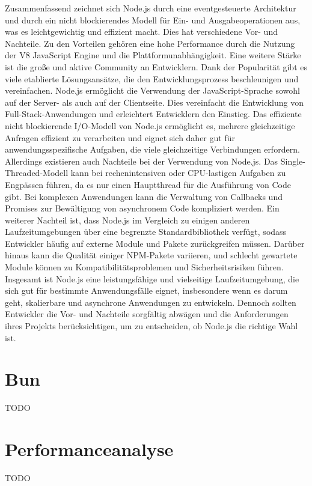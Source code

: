 \noindent
Zusammenfassend zeichnet sich Node.js durch eine eventgesteuerte Architektur und durch ein nicht blockierendes Modell für Ein- und Ausgabeoperationen aus, was es leichtgewichtig und effizient macht. Dies hat verschiedene Vor- und Nachteile. \newline
Zu den Vorteilen gehören eine hohe Performance durch die Nutzung der V8 JavaScript Engine und die Plattformunabhängigkeit. Eine weitere Stärke ist die große und aktive Community an Entwicklern. Dank der Popularität gibt es viele etablierte Lösungsansätze, die den Entwicklungsprozess beschleunigen und vereinfachen. \cite{OpenJSFoundation.2022} Node.js ermöglicht die Verwendung der JavaScript-Sprache sowohl auf der Server- als auch auf der Clientseite. Dies vereinfacht die Entwicklung von Full-Stack-Anwendungen und erleichtert Entwicklern den Einstieg. \cite{Brown.November2019} Das effiziente nicht blockierende I/O-Modell von Node.js ermöglicht es, mehrere gleichzeitige Anfragen effizient zu verarbeiten und eignet sich daher gut für anwendungsspezifische Aufgaben, die viele gleichzeitige Verbindungen erfordern.   \newline
Allerdings existieren auch Nachteile bei der Verwendung von Node.js. Das Single-Threaded-Modell kann bei rechenintensiven oder CPU-lastigen Aufgaben zu Engpässen führen, da es nur einen Hauptthread für die Ausführung von Code gibt. Bei komplexen Anwendungen kann die Verwaltung von Callbacks und Promises zur Bewältigung von asynchronem Code kompliziert werden.  \newline
Ein weiterer Nachteil ist, dass Node.js im Vergleich zu einigen anderen Laufzeitumgebungen über eine begrenzte Standardbibliothek verfügt, sodass Entwickler häufig auf externe Module und Pakete zurückgreifen müssen. Darüber hinaus kann die Qualität einiger NPM-Pakete variieren, und schlecht gewartete Module können zu Kompatibilitätsproblemen und Sicherheitsrisiken führen.  \newline
Insgesamt ist Node.js eine leistungsfähige und vielseitige Laufzeitumgebung, die sich gut für bestimmte Anwendungsfälle eignet, insbesondere wenn es darum geht, skalierbare und asynchrone Anwendungen zu entwickeln. Dennoch sollten Entwickler die Vor- und Nachteile sorgfältig abwägen und die Anforderungen ihres Projekts berücksichtigen, um zu entscheiden, ob Node.js die richtige Wahl ist. 



\section{Bun} \label{sec:Node}
TODO\\

\section{Performanceanalyse} \label{sec:Performanceanalyse}
TODO\\
